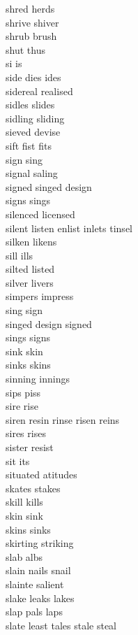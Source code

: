 shred herds\\
shrive shiver\\
shrub brush\\
shut thus\\
si is\\
side dies ides\\
sidereal realised\\
sidles slides\\
sidling sliding\\
sieved devise\\
sift fist fits\\
sign sing\\
signal saling\\
signed singed design\\
signs sings\\
silenced licensed\\
silent listen enlist inlets tinsel\\
silken likens\\
sill ills\\
silted listed\\
silver livers\\
simpers impress\\
sing sign\\
singed design signed\\
sings signs\\
sink skin\\
sinks skins\\
sinning innings\\
sips piss\\
sire rise\\
siren resin rinse risen reins\\
sires rises\\
sister resist\\
sit its\\
situated atitudes\\
skates stakes\\
skill kills\\
skin sink\\
skins sinks\\
skirting striking\\
slab albs\\
slain nails snail\\
slainte salient\\
slake leaks lakes\\
slap pals laps\\
slate least tales stale steal\\
